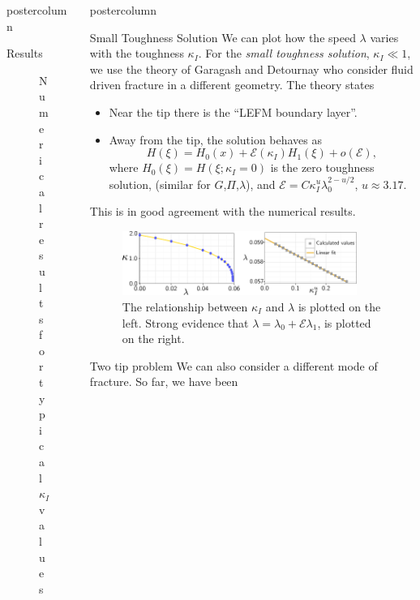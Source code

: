 \documentclass{beamer}
\newcommand{\cE}{\mathcal{E}}                               %
\newlength{\columnheight}
\begin{document}
\begin{frame}
\begin{columns}
\begin{column}{.43\textwidth}
\begin{beamercolorbox}[center]{postercolumn}
\begin{minipage}{.98\textwidth}
{\begin{myblock}{Results}
\begin{figure}
\caption{Numerical results for typical $\kappa_I$ values}
\end{figure}
\end{myblock}\vfill
}\end{minipage}\end{beamercolorbox}
\end{column}
\begin{column}{.57\textwidth}
\begin{beamercolorbox}[center]{postercolumn}
\begin{minipage}{.98\textwidth} %
\parbox[t][\columnheight]{\textwidth}{ %
\begin{myblock}{Small Toughness Solution}
We can plot how the speed $\lambda$ varies with the toughness $\kappa_I$.
For the \emph{small toughness solution}, $\kappa_I \ll 1$, we 
use the theory of Garagash and Detournay \cite{GandD} who consider
fluid driven fracture in a different geometry.
The theory states
\begin{itemize}
\item Near the tip there is the ``LEFM boundary layer''.
\item Away from the tip, the solution behaves as 
      \[H(\xi) = H_0(x) + \cE(\kappa_I)H_1(\xi)+o(\cE),\]
      where $H_0(\xi) = H(\xi ; \kappa_I=0)$ is  the zero toughness solution,
      (similar for $G$,$\Pi$,$\lambda$), and 
      $\cE = C \kappa_I^{u}\lambda_0^{2-u/2}$, $u \approx 3.17$. 
\end{itemize}
This is in good agreement with the numerical results.
\begin{figure}
\centering\includegraphics[width=0.9\textwidth]{l0-poster.pdf}
\caption{The relationship between $\kappa_I$ and $\lambda$ is plotted on the left.
         Strong evidence that $\lambda = \lambda_0 + \cE \lambda_1$, is plotted  
         on the right.}
\end{figure}
\end{myblock}\vfill
\begin{myblock}{Two tip problem}
We can also consider a different mode of fracture. So far, we have been

\end{myblock}}
\end{minipage}
\end{beamercolorbox}
\end{column}
\end{columns}
\end{frame}
\end{document}
